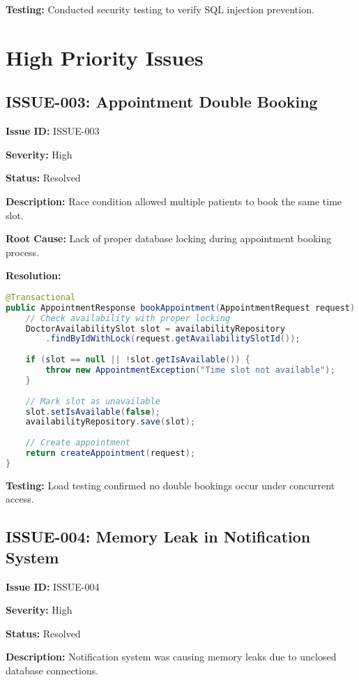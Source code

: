 \documentclass[12pt,a4paper]{article}
\begin{document}
\textbf{Testing:} Conducted security testing to verify SQL injection prevention.

\section{High Priority Issues}

\subsection{ISSUE-003: Appointment Double Booking}

\textbf{Issue ID:} ISSUE-003

\textbf{Severity:} High

\textbf{Status:} Resolved

\textbf{Description:} Race condition allowed multiple patients to book the same time slot.

\textbf{Root Cause:} Lack of proper database locking during appointment booking process.

\textbf{Resolution:}
\begin{lstlisting}[language=Java, caption=Double Booking Fix]
@Transactional
public AppointmentResponse bookAppointment(AppointmentRequest request) {
    // Check availability with proper locking
    DoctorAvailabilitySlot slot = availabilityRepository
        .findByIdWithLock(request.getAvailabilitySlotId());
    
    if (slot == null || !slot.getIsAvailable()) {
        throw new AppointmentException("Time slot not available");
    }
    
    // Mark slot as unavailable
    slot.setIsAvailable(false);
    availabilityRepository.save(slot);
    
    // Create appointment
    return createAppointment(request);
}
\end{lstlisting}

\textbf{Testing:} Load testing confirmed no double bookings occur under concurrent access.

\subsection{ISSUE-004: Memory Leak in Notification System}

\textbf{Issue ID:} ISSUE-004

\textbf{Severity:} High

\textbf{Status:} Resolved

\textbf{Description:} Notification system was causing memory leaks due to unclosed database connections.
\end{document}

